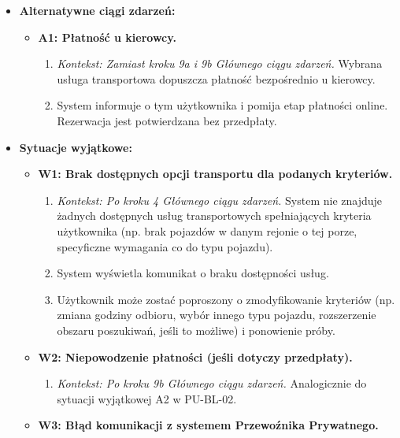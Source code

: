 \documentclass[a4paper,12pt]{article}
\begin{document}
\begin{itemize}
\begin{enumerate}
        \end{enumerate}
    \item \textbf{Alternatywne ciągi zdarzeń:}
        \begin{itemize}
            \item \textbf{A1: Płatność u kierowcy.}
                \begin{enumerate}
                    \item \textit{Kontekst: Zamiast kroku 9a i 9b Głównego ciągu zdarzeń.} Wybrana usługa transportowa dopuszcza płatność bezpośrednio u kierowcy.
                    \item System informuje o tym użytkownika i pomija etap płatności online. Rezerwacja jest potwierdzana bez przedpłaty.
                \end{enumerate}
        \end{itemize}
    \item \textbf{Sytuacje wyjątkowe:}
        \begin{itemize}
            \item \textbf{W1: Brak dostępnych opcji transportu dla podanych kryteriów.}
                \begin{enumerate}
                    \item \textit{Kontekst: Po kroku 4 Głównego ciągu zdarzeń.} System nie znajduje żadnych dostępnych usług transportowych spełniających kryteria użytkownika (np. brak pojazdów w danym rejonie o tej porze, specyficzne wymagania co do typu pojazdu).
                    \item System wyświetla komunikat o braku dostępności usług.
                    \item Użytkownik może zostać poproszony o zmodyfikowanie kryteriów (np. zmiana godziny odbioru, wybór innego typu pojazdu, rozszerzenie obszaru poszukiwań, jeśli to możliwe) i ponowienie próby.
                \end{enumerate}
            \item \textbf{W2: Niepowodzenie płatności (jeśli dotyczy przedpłaty).}
                \begin{enumerate}
                    \item \textit{Kontekst: Po kroku 9b Głównego ciągu zdarzeń.} Analogicznie do sytuacji wyjątkowej A2 w PU-BL-02.
                \end{enumerate}
            \item \textbf{W3: Błąd komunikacji z systemem Przewoźnika Prywatnego.}
                \begin{enumerate}

\end{enumerate}
\end{itemize}
\end{itemize}
\end{document}
